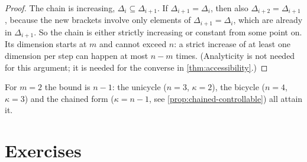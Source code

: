 \begin{proof}
The chain is increasing, \( \Delta_i \subseteq \Delta_{i+1} \). If
\( \Delta_{i+1} = \Delta_i \), then also \( \Delta_{i+2} = \Delta_{i+1} \),
because the new brackets involve only elements of
\( \Delta_{i+1} = \Delta_i \), which are already in \( \Delta_{i+1} \).
So the chain is either strictly increasing or constant from some point
on. Its dimension starts at \( m \) and cannot exceed \( n \): a strict
increase of at least one dimension per step can happen at most
\( n - m \) times. (Analyticity is not needed for this argument; it is
needed for the converse in \cref{thm:accessibility}.)
\end{proof}

For \( m = 2 \) the bound is \( n - 1 \): the unicycle (\( n = 3 \),
\( \kappa = 2 \)), the bicycle (\( n = 4 \), \( \kappa = 3 \)) and the
chained form (\( \kappa = n - 1 \), see
\cref{prop:chained-controllable}) all attain it.

\section{Exercises}
\label{sec:controllability-exercises}

